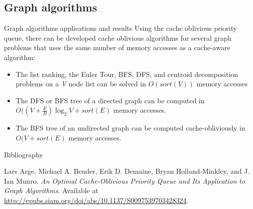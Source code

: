 \documentclass{beamer}
\begin{document}
\begin{darkframes}
    \subsection{Graph algorithms}
    \begin{frame}{Graph algorithms applications and results}
    Using the cache oblivious priority queue, there can be developed cache oblivious algorithms for several graph problems that uses the same number of memory accesses as a cache-aware algorithm:
    \begin{itemize}
    \item The list ranking, the Euler Tour, BFS, DFS, and centroid decomposition problems on a \textit{V} node list can be solved in \(O(sort(V))\) memory accesses
    \item The DFS or BFS tree of a directed graph can be computed in \(O((V + \frac{E}{B})\log_2 V + sort(E)\) memory accesses.
    \item The BFS tree of an undirected graph can be computed cache-obliviously in \(O(V + sort(E)\) memory accesses.
    \end{itemize}
    \end{frame}

    \begin{frame}[label=bibliography]{Bibliography}
      \begin{thebibliography}{9}
            Lars Arge, Michael A. Bender, Erik D. Demaine, Bryan Holland‐Minkley, and J. Ian Munro.
            \emph{An Optimal Cache‐Oblivious Priority Queue and Its Application to Graph Algorithms}.
            Available at \url{http://epubs.siam.org/doi/abs/10.1137/S0097539703428324}.
      \end{thebibliography}
    \end{frame}
  \end{darkframes}
\end{document}
